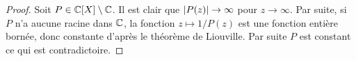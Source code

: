 \begin{proof}
Soit $P \in \mathbb{C}[X] \setminus \mathbb{C}$. Il est clair que $\lvert P(z)\rvert \to \infty$ pour $z \to \infty$.
Par suite, si $P$ n'a aucune racine dans $\mathbb{C}$, la fonction $z \mapsto 1/P(z)$ est une fonction entière bornée, 
donc constante d'après le théorème de Liouville. Par suite $P$ est constant ce qui est contradictoire.
\end{proof}

%

